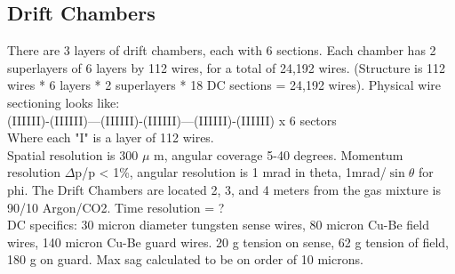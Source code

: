         \subsection{Drift Chambers}
            There are 3 layers of drift chambers, each with 6 sections. Each chamber has 2 superlayers of 6 layers by 112 wires, for a total of 24,192 wires. (Structure is 112 wires * 6 layers * 2 superlayers * 18 DC sections = 24,192 wires). Physical wire sectioning looks like:\\
            (IIIIII)-(IIIIII)---(IIIIII)-(IIIIII)---(IIIIII)-(IIIIII) x 6 sectors\\
            Where each "I" is a layer of 112 wires.\\
            Spatial resolution is 300 $\mu$ m, angular coverage 5-40 degrees. Momentum resolution $\Delta$p/p < 1\%, angular resolution is 1 mrad in theta, 1mrad/$\sin{\theta}$ for phi. The Drift Chambers are located 2, 3, and 4 meters from the gas mixture is 90/10 Argon/CO2. Time resolution = ?\\
            DC specifics: 30 micron diameter tungsten sense wires, 80 micron Cu-Be field wires, 140 micron Cu-Be guard wires. 20 g tension on sense, 62 g tension of field, 180 g on guard. Max sag calculated to be on order of 10 microns.
            
